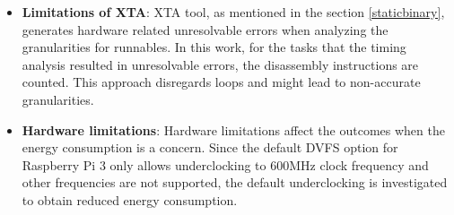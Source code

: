 \begin{itemize}
	\item \textbf{Limitations of XTA}: XTA tool, as mentioned in the section \ref{staticbinary}, generates hardware related unresolvable errors when analyzing the granularities for runnables. In this work, for the tasks that the timing analysis resulted in unresolvable errors, the disassembly instructions are counted. This approach disregards loops and might lead to non-accurate granularities.
	\item \textbf{Hardware limitations}: Hardware limitations affect the outcomes when the energy consumption is a concern. Since the default DVFS option for Raspberry Pi 3 only allows underclocking to 600MHz clock frequency and other frequencies are not supported, the default underclocking is investigated to obtain reduced energy consumption.%
\end{itemize}
